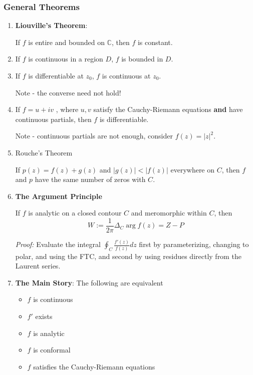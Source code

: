 \documentclass{article}
\begin{document}
\subsubsection{General Theorems}
\begin{enumerate}
   \item \textbf{Liouville's Theorem}: 
   
   If $f$ is entire and bounded on $\mathbb{C}$, then $f$ is constant.
   
   \item If $f$ is continuous in a region $D$, $f$ is bounded in $D$.
   
   \item If $f$ is differentiable at $z_0$, $f$ is continuous at $z_0$.
   
   Note - the converse need not hold!
   
   \item If $f = u + iv$ , where $u,v$ satisfy the Cauchy-Riemann equations \textbf{and} have continuous partials, then $f$ is differentiable.
   
   Note - continuous partials are not enough, consider $f(z) = |z|^2$.
   
   \item Rouche's Theorem
   
   If $p(z) = f(z) + g(z)$ and $|g(z)| < |f(z)|$ everywhere on $C$, then $f$ and $p$ have the same number of zeros with $C$.
   
   
   \item \textbf{The Argument Principle}
   
   If $f$ is analytic on a closed contour $C$ and meromorphic within $C$, then
   \[
   W := \frac{1}{2\pi}\Delta_C \arg f(z) = Z - P
   \]
   
   \textit{Proof:} Evaluate the integral $\oint_C \frac{f'(z)}{f(z)} dz$ first by parameterizing, changing to polar, and using the FTC, and second by using residues directly from the Laurent series.
   
   \item \textbf{The Main Story}: The following are equivalent
   
   \begin{itemize}
       \item $f$ is continuous
       \item $f'$ exists
       \item $f$ is analytic
       \item $f$ is conformal
       \item $f$ satisfies the Cauchy-Riemann equations
   \end{itemize}
   
\end{enumerate}
\end{document}
